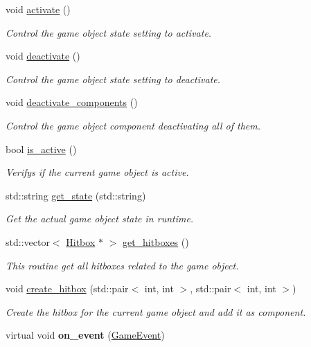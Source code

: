 \begin{DoxyCompactItemize}
void \hyperlink{classengine_1_1_game_object_a1b0eacb99cbbb27e87e12ec54d36a9d7}{activate} ()
\begin{DoxyCompactList}\small\item\em Control the game object state setting to activate. \end{DoxyCompactList}\item 
void \hyperlink{classengine_1_1_game_object_a07959eddddd69a9eee5e1dd3842c193c}{deactivate} ()
\begin{DoxyCompactList}\small\item\em Control the game object state setting to deactivate. \end{DoxyCompactList}\item 
void \hyperlink{classengine_1_1_game_object_a53ecb7384b8fcfe8b0d887603070d8b1}{deactivate\+\_\+components} ()
\begin{DoxyCompactList}\small\item\em Control the game object component deactivating all of them. \end{DoxyCompactList}\item 
bool \hyperlink{classengine_1_1_game_object_aac0171415e6af36c39c61288a704c613}{is\+\_\+active} ()
\begin{DoxyCompactList}\small\item\em Verifys if the current game object is active. \end{DoxyCompactList}\item 
std\+::string \hyperlink{classengine_1_1_game_object_acd2c3f8e4ef6a0116108fbb59e9241f1}{get\+\_\+state} (std\+::string)
\begin{DoxyCompactList}\small\item\em Get the actual game object state in runtime. \end{DoxyCompactList}\item 
std\+::vector$<$ \hyperlink{classengine_1_1_hitbox}{Hitbox} $\ast$ $>$ \hyperlink{classengine_1_1_game_object_aea5d44c3ed89d21e808a95287a933612}{get\+\_\+hitboxes} ()
\begin{DoxyCompactList}\small\item\em This routine get all hitboxes related to the game object. \end{DoxyCompactList}\item 
void \hyperlink{classengine_1_1_game_object_a6c1e7f2de3b512452a44fc908dc03f33}{create\+\_\+hitbox} (std\+::pair$<$ int, int $>$, std\+::pair$<$ int, int $>$)
\begin{DoxyCompactList}\small\item\em Create the hitbox for the current game object and add it as component. \end{DoxyCompactList}\item 
virtual void {\bfseries on\+\_\+event} (\hyperlink{class_game_event}{Game\+Event})\hypertarget{classengine_1_1_game_object_a01a503c00127facdd2416b93475cb275}{}\label{classengine_1_1_game_object_a01a503c00127facdd2416b93475cb275}


\end{DoxyCompactItemize}
